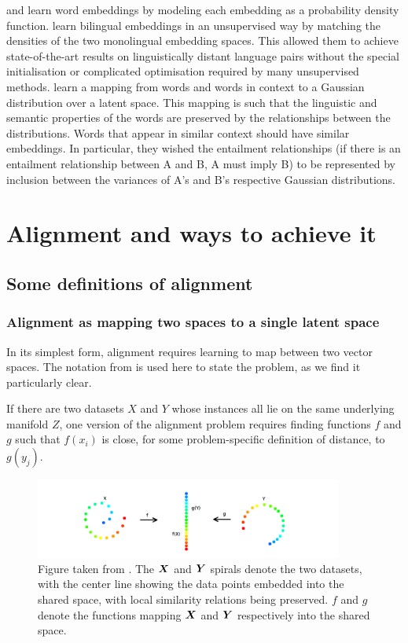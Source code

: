 \cite{DensityMatchingWordEmbeddings} and \cite{vilnis2015word} learn word embeddings by modeling each embedding as a probability density function. \cite{DensityMatchingWordEmbeddings} learn bilingual embeddings in an unsupervised way by matching the densities of the two monolingual embedding spaces. This allowed them to achieve state-of-the-art results on linguistically distant language pairs without the special initialisation or complicated optimisation required by many unsupervised methods. \cite{vilnis2015word} learn a mapping from words and words in context to a Gaussian distribution over a latent space. This mapping is such that the linguistic and semantic properties of the words are preserved by the relationships between the distributions. Words that appear in similar context should have similar embeddings. In particular, they wished the entailment relationships (if there is an entailment relationship between A and B, A must imply B) to be represented by inclusion between the variances of A's and B's respective Gaussian distributions. 

\section{Alignment and ways to achieve it}
    
\subsection{Some definitions of alignment}

\subsubsection{Alignment as mapping two spaces to a single latent space}
In its simplest form, alignment requires learning to map between two vector spaces. The notation from \cite{ManifoldLearningTheoryAndApplications} is used here to state the problem, as we find it particularly clear.

If there are two datasets $X$ and $Y$ whose instances all lie on the same underlying manifold $Z$, one version of the alignment problem requires finding functions $f$ and $g$ such that $f(x_i)$ is close, for some problem-specific definition of distance, to $g(y_j)$.

\begin{figure}[H]
    \centering
    \includegraphics[width=0.9\textwidth]{images/review/alignment.png}
    \caption{
        Figure taken from \cite{ManifoldLearningTheoryAndApplications}. The $\boldsymbol{X}$ and $\boldsymbol{Y}$ spirals denote the two datasets, with the center line showing the data points embedded into the shared space, with local similarity relations being preserved. $f$ and $g$ denote the functions mapping $\boldsymbol{X}$ and $\boldsymbol{Y}$ respectively into the shared space. 
    }
\end{figure}

